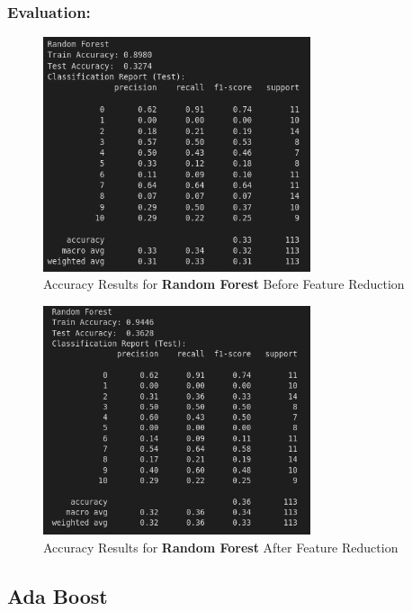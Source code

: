 \documentclass[a4paper,12pt]{article}
\begin{document}
\subsubsection{Evaluation:}
\begin{figure}[H]
    \centering
    \includegraphics[width=0.7\textwidth]{./images/rfacc1.png}
    \caption{Accuracy Results for \textbf{Random Forest} Before Feature Reduction}
    \label{fig:fig_17}
\end{figure}
\begin{figure}[H]
    \centering
    \includegraphics[width=0.7\textwidth]{./images/rfacc2.png}
    \caption{Accuracy Results for \textbf{Random Forest} After Feature Reduction}
    \label{fig:fig_18}
\end{figure}

\subsection{Ada Boost}
\end{document}
